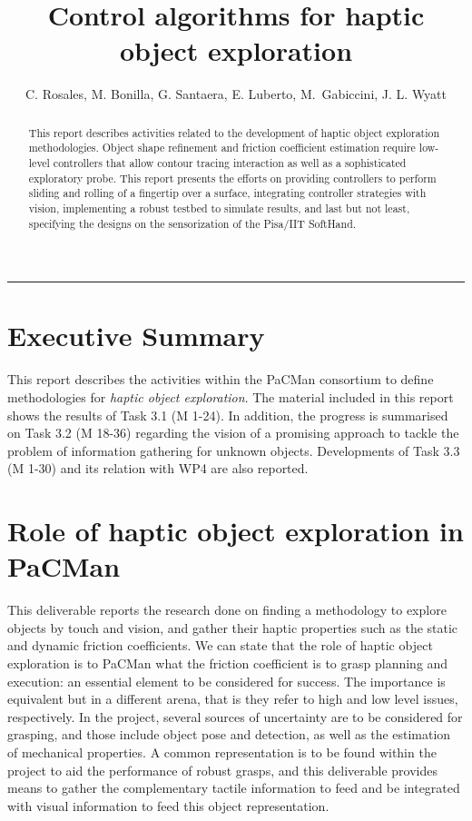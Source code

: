 \documentclass[a4paper,11pt,pdf]{pacmanreport}
\title{Control algorithms for haptic object exploration}
\author{C. Rosales, M. Bonilla, G. Santaera, E. Luberto, \mbox{M. Gabiccini}, J. L. Wyatt}
\begin{document}
\maketitle

\begin{abstract}
\noindent This report describes activities related to the development of haptic object exploration methodologies. Object shape refinement and friction coefficient estimation require low-level controllers that allow contour tracing interaction as well as a sophisticated exploratory probe. This report presents the efforts on providing controllers to perform sliding and rolling of a fingertip over a surface, integrating controller strategies with vision, implementing a robust testbed to simulate results, and last but not least, specifying the designs on the sensorization of the Pisa/IIT SoftHand.
\end{abstract}

\vspace{.2em}
\hrule

\footnotesize

\tableofcontents

\normalsize

\newpage

\section*{Executive Summary}
This report describes the activities within the PaCMan consortium to define methodologies for \emph{haptic object exploration}. The material included in this report shows the results of Task 3.1 (M 1-24). In addition, the progress is summarised on Task 3.2 (M 18-36) regarding the vision of a promising approach to tackle the problem of information gathering for unknown objects. Developments of Task 3.3 (M 1-30) and its relation with WP4 are also reported.

\section*{Role of haptic object exploration in PaCMan}

This deliverable reports the research done on finding a methodology to explore objects by touch and vision, and gather their haptic properties such as the static and dynamic friction coefficients. We can state that the role of haptic object exploration is to PaCMan what the friction coefficient is to grasp planning and execution: an essential element to be considered for success. The importance is equivalent but in a different arena, that is they refer to high and low level issues, respectively. In the project, several sources of uncertainty are to be considered for grasping, and those include object pose and detection, as well as the estimation of mechanical properties. A common representation is to be found within the project to aid the performance of robust grasps, and this deliverable provides means to gather the complementary tactile information to feed and be integrated with visual information to feed this object representation.
\end{document}
